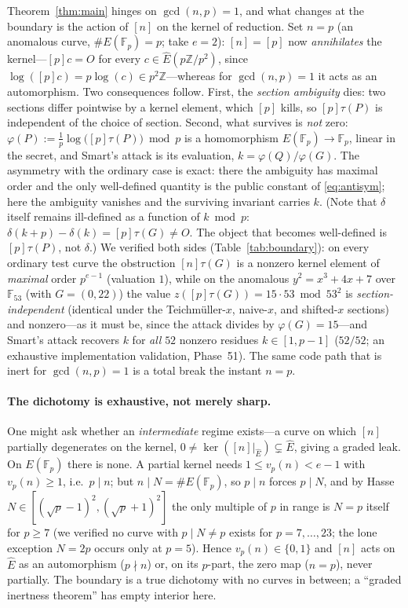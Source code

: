 \documentclass[11pt]{article}
\theoremstyle{definition}
\newcommand{\Fp}{\mathbb{F}_p}
\newcommand{\Z}{\mathbb{Z}}
\newcommand{\Ehat}{\widehat{E}}
\begin{document}
Theorem~\ref{thm:main} hinges on $\gcd(n,p)=1$, and what changes at the
boundary is the action of $[n]$ on the kernel of reduction. Set $n=p$ (an
anomalous curve, $\#E(\Fp)=p$; take $e=2$): $[n]=[p]$ now
\emph{annihilates} the kernel---$[p]c=O$ for every
$c\in\Ehat(p\Z/p^2)$, since $\log([p]c)=p\log(c)\in p^2\Z$---whereas for
$\gcd(n,p)=1$ it acts as an automorphism. Two consequences follow. First,
the \emph{section ambiguity} dies: two sections differ pointwise by a
kernel element, which $[p]$ kills, so $[p]\tau(P)$ is independent of the
choice of section. Second, what survives is \emph{not} zero:
$\varphi(P):=\tfrac1p\log\!\big([p]\tau(P)\big)\bmod p$ is a homomorphism
$E(\Fp)\to\Fp$, linear in the secret, and Smart's attack is its
evaluation, $k=\varphi(Q)/\varphi(G)$. The asymmetry with the ordinary
case is exact: there the ambiguity has maximal order and the only
well-defined quantity is the public constant of \eqref{eq:antisym}; here
the ambiguity vanishes and the surviving invariant carries $k$. (Note
that $\delta$ itself remains ill-defined as a function of $k\bmod p$:
$\delta(k+p)-\delta(k)=[p]\tau(G)\neq O$. The object that becomes
well-defined is $[p]\tau(P)$, not $\delta$.) We verified both sides
(Table~\ref{tab:boundary}): on every ordinary test curve the obstruction
$[n]\tau(G)$ is a nonzero kernel element of \emph{maximal} order
$p^{e-1}$ (valuation $1$), while on the anomalous $y^2=x^3+4x+7$ over
$\mathbb F_{53}$ (with $G=(0,22)$) the value
$z([p]\tau(G))=15\cdot 53\bmod 53^2$ is \emph{section-independent}
(identical under the Teichm\"uller-$x$, naive-$x$, and shifted-$x$
sections) and nonzero---as it must be, since the attack divides by
$\varphi(G)=15$---and Smart's attack recovers $k$ for \emph{all} $52$
nonzero residues $k\in[1,p-1]$ ($52/52$; an exhaustive implementation
validation, Phase~51). The same code path that is inert for $\gcd(n,p)=1$
is a total break the instant $n=p$.

\paragraph{The dichotomy is exhaustive, not merely sharp.} One might ask
whether an \emph{intermediate} regime exists---a curve on which $[n]$
partially degenerates on the kernel, $0\neq\ker([n]|_{\Ehat})\subsetneq
\Ehat$, giving a graded leak. On $E(\Fp)$ there is none. A partial kernel
needs $1\le v_p(n)<e-1$ with $v_p(n)\ge1$, i.e.\ $p\mid n$; but $n\mid
N=\#E(\Fp)$, so $p\mid n$ forces $p\mid N$, and by Hasse
$N\in[(\sqrt p-1)^2,(\sqrt p+1)^2]$ the only multiple of $p$ in range is
$N=p$ itself for $p\ge7$ (we verified no curve with $p\mid N\neq p$
exists for $p=7,\dots,23$; the lone exception $N=2p$ occurs only at
$p=5$). Hence $v_p(n)\in\{0,1\}$ and $[n]$ acts on $\Ehat$ as an
automorphism ($p\nmid n$) or, on its $p$-part, the zero map ($n=p$),
never partially. The boundary is a true dichotomy with no curves in
between; a ``graded inertness theorem'' has empty interior here.
\end{document}
